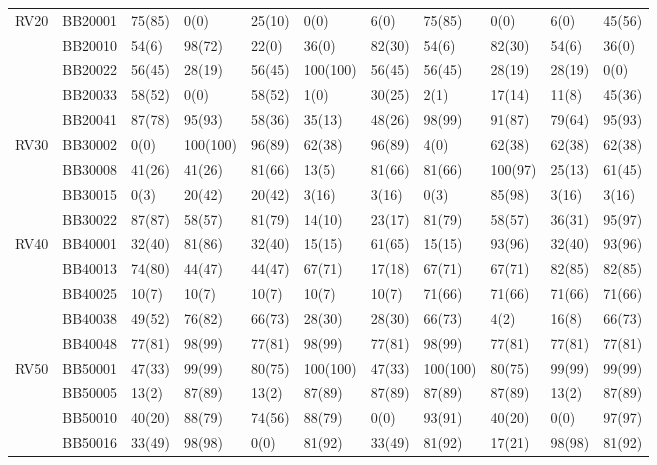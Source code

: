 \begin{table}[!h]
\begin{tabular}{|c|l|l|l|l|l|l|l|l|l|l|}
		\hline \hline
		\multirow{5}{*}{RV20} & BB20001 & 75(85) & 0(0)  & 25(10) & 0(0)  & 6(0)  & 75(85) & 0(0)  & 6(0)  & 45(56) \\
		\cline{2-11}          & BB20010 & 54(6) & 98(72) & 22(0) & 36(0) & 82(30) & 54(6) & 82(30) & 54(6) & 36(0) \\
		\cline{2-11}          & BB20022 & 56(45) & 28(19) & 56(45) & 100(100) & 56(45) & 56(45) & 28(19) & 28(19) & 0(0) \\
		\cline{2-11}          & BB20033 & 58(52) & 0(0)  & 58(52) & 1(0)  & 30(25) & 2(1)  & 17(14) & 11(8) & 45(36) \\
		\cline{2-11}          & BB20041 & 87(78) & 95(93) & 58(36) & 35(13) & 48(26) & 98(99) & 91(87) & 79(64) & 95(93) \\
		\hline \hline
		\multirow{4}{*}{RV30} & BB30002 & 0(0)  & 100(100) & 96(89) & 62(38) & 96(89) & 4(0)  & 62(38) & 62(38) & 62(38) \\
		\cline{2-11}          & BB30008 & 41(26) & 41(26) & 81(66) & 13(5) & 81(66) & 81(66) & 100(97) & 25(13) & 61(45) \\
		\cline{2-11}          & BB30015 & 0(3)  & 20(42) & 20(42) & 3(16) & 3(16) & 0(3)  & 85(98) & 3(16) & 3(16) \\
		\cline{2-11}          & BB30022 & 87(87) & 58(57) & 81(79) & 14(10) & 23(17) & 81(79) & 58(57) & 36(31) & 95(97) \\
		\hline \hline
		\multirow{5}{*}{RV40} & BB40001 & 32(40) & 81(86) & 32(40) & 15(15) & 61(65) & 15(15) & 93(96) & 32(40) & 93(96) \\
		\cline{2-11}         & BB40013 & 74(80) & 44(47) & 44(47) & 67(71) & 17(18) & 67(71) & 67(71) & 82(85) & 82(85) \\
		\cline{2-11}         & BB40025 & 10(7) & 10(7) & 10(7) & 10(7) & 10(7) & 71(66) & 71(66) & 71(66) & 71(66) \\
		\cline{2-11}         & BB40038 & 49(52) & 76(82) & 66(73) & 28(30) & 28(30) & 66(73) & 4(2)  & 16(8) & 66(73) \\
		\cline{2-11}         & BB40048 & 77(81) & 98(99) & 77(81) & 98(99) & 77(81) & 98(99) & 77(81) & 77(81) & 77(81) \\
		\hline \hline
		\multirow{4}{*}{RV50} & BB50001 & 47(33) & 99(99) & 80(75) & 100(100) & 47(33) & 100(100) & 80(75) & 99(99) & 99(99) \\
		\cline{2-11}          & BB50005 & 13(2) & 87(89) & 13(2) & 87(89) & 87(89) & 87(89) & 87(89) & 13(2) & 87(89) \\
		\cline{2-11}          & BB50010 & 40(20) & 88(79) & 74(56) & 88(79) & 0(0)  & 93(91) & 40(20) & 0(0)  & 97(97) \\
		\cline{2-11}          & BB50016 & 33(49) & 98(98) & 0(0)  & 81(92) & 33(49) & 81(92) & 17(21) & 98(98) & 81(92) \\
		\hline
	\end{tabular}%
	\label{tab:balibase_good_solutions_simg_simng}%
\end{table}%

